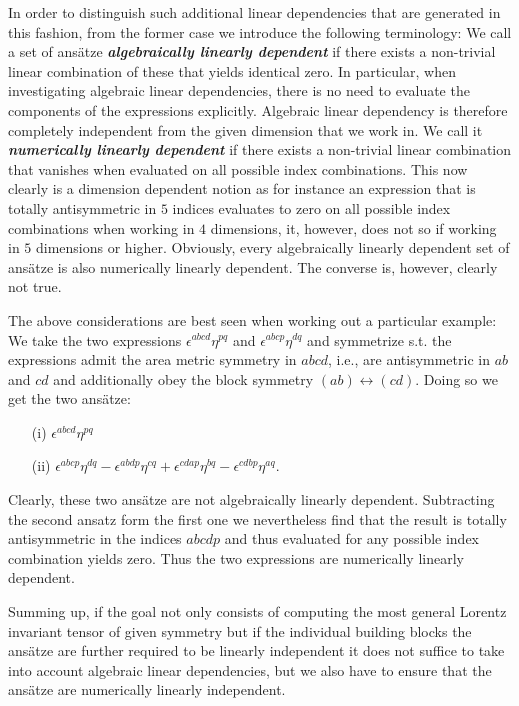 In order to distinguish such additional linear dependencies that are generated in this fashion, from the former case we introduce the following terminology: We call a set of ansätze \textit{\textbf{algebraically linearly dependent}} if there exists a non-trivial linear combination of these that yields identical zero. In particular, when investigating algebraic linear dependencies, there is no need to evaluate the components of the expressions explicitly. Algebraic linear dependency is therefore completely  independent from the given dimension that we work in. We call it \textbf{\textit{numerically linearly dependent}} if there exists a non-trivial linear combination that vanishes when evaluated on all possible index combinations. This now clearly is a dimension dependent notion as for instance an expression that is totally antisymmetric in $5$ indices evaluates to zero on all possible index combinations when working in $4$ dimensions, it, however, does not so if working in $5$ dimensions or higher. Obviously, every algebraically linearly dependent set of ansätze is also numerically linearly dependent. The converse is, however, clearly not true. 

The above considerations are best seen when working out a particular example: We take the two expressions $\epsilon^{abcd} \eta^{pq}$ and $\epsilon^{abcp} \eta^{dq}$ and symmetrize s.t. the expressions admit the area metric symmetry in $abcd$, i.e., are antisymmetric in $ab$ and $cd$ and additionally obey the block symmetry $(ab) \leftrightarrow (cd)$. Doing so we get the two ansätze: 
\begin{itemize}
\item[(i)] $\epsilon^{abcd} \eta^{pq}$ 
\item[(ii)] $\epsilon^{abcp} \eta^{dq} - \epsilon^{abdp} \eta^{cq} + \epsilon^{cdap} \eta^{bq} - \epsilon^{cdbp} \eta^{aq}$.
\end{itemize}
Clearly, these two ansätze are not algebraically linearly dependent. Subtracting the second ansatz form the first one we nevertheless find that the result is totally antisymmetric in the indices $abcdp$ and thus evaluated for any possible index combination yields zero. Thus the two expressions are numerically linearly dependent.

Summing up, if the goal not only consists of computing the most general Lorentz invariant tensor of given symmetry but if the individual building blocks the ansätze are further required to be linearly independent it does not suffice to take into account algebraic linear dependencies, but we also have to ensure that the ansätze are numerically linearly independent.  

